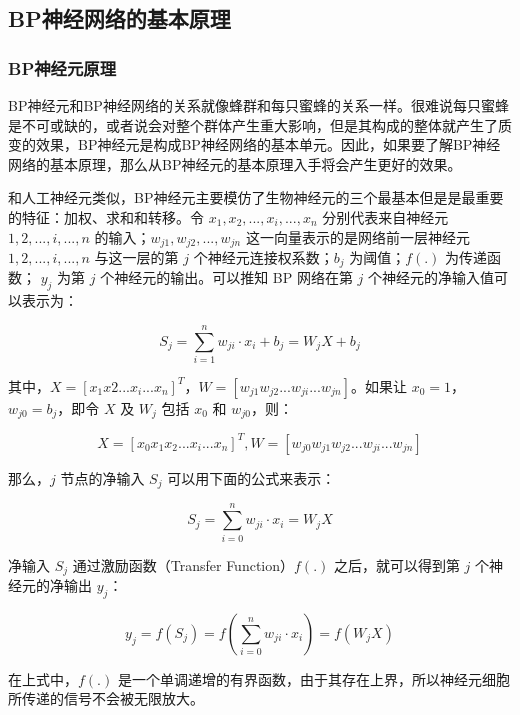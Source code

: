 \documentclass[UTF8]{ctexart}
\begin{document}
\subsection{BP神经网络的基本原理}

\subsubsection{BP神经元原理}

BP神经元和BP神经网络的关系就像蜂群和每只蜜蜂的关系一样。很难说每只蜜蜂是不可或缺的，或者说会对整个群体产生重大影响，但是其构成的整体就产生了质变的效果，BP神经元是构成BP神经网络的基本单元。因此，如果要了解BP神经网络的基本原理，那么从BP神经元的基本原理入手将会产生更好的效果。 \par

和人工神经元类似，BP神经元主要模仿了生物神经元的三个最基本但是是最重要的特征：加权、求和和转移。令 $x_1,x_2,...,x_i,...,x_n$ 分别代表来自神经元 $1,2,...,i,...,n$ 的输入；$w_{j1},w_{j2},...,w_{jn}$ 这一向量表示的是网络前一层神经元 $1,2,...,i,...,n$ 与这一层的第 $j$ 个神经元连接权系数；$b_j$ 为阈值；$f(.)$ 为传递函数； $y_j$ 为第 $j$ 个神经元的输出。可以推知 BP 网络在第 $j$ 个神经元的净输入值可以表示为：

\begin{equation} 
S_j = \sum_{i=1}^n w_{ji} \cdot x_i + b_j = W_j X + b_j
\end{equation}

其中，$X = [x_1x2...x_i...x_n]^T$，$W=[w_{j1}w_{j2}...w_{ji}...w_{jn}]$。如果让 $x_0=1$，$w_{j0}=b_j$，即令 $X$ 及 $W_j$ 包括 $x_0$ 和 $w_{j0}$，则：

\begin{equation} 
X=[x_0x_1x_2...x_i...x_n]^T,W=[w_{j0}w_{j1}w_{j2}...w_{ji}...w_{jn}]
\end{equation}

那么，$j$ 节点的净输入 $S_j$ 可以用下面的公式来表示：

\begin{equation} 
S_j = \sum_{i=0}^n w_{ji} \cdot x_i = W_j X
\end{equation}

净输入 $S_j$ 通过激励函数（Transfer Function）$f(.)$ 之后，就可以得到第 $j$ 个神经元的净输出 $y_j$：

\begin{equation} 
y_j = f(S_j) = f(\sum_{i=0}^n w_{ji} \cdot x_i) = f(W_j X)
\end{equation}

在上式中，$f(.)$ 是一个单调递增的有界函数，由于其存在上界，所以神经元细胞所传递的信号不会被无限放大。
\end{document}
